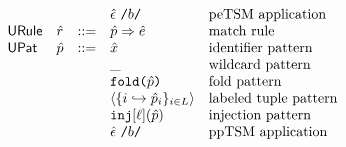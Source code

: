 \[\begin{array}{lllllll}
&&
& \utsmap{\uepsilon}{b} & \text{peTSM application}\\%
\mathsf{URule} & \urv & ::= 
& \matchrule{\upv}{\ue} & \text{match rule}\\
\mathsf{UPat} & \upv & ::= 
& \ux & \text{identifier pattern}\\
&&
& \wildp & \text{wildcard pattern}\\
&&
& \foldp{\upv} & \text{fold pattern}\\
&&
& \tplp{\mapschema{\upv}{i}{\labelset}} & \text{labeled tuple pattern}\\
&&
& \injp{\ell}{\upv} 
& \text{injection pattern}\\
&&
& \utsmap{\uepsilon}{b} & \text{ppTSM application}%
\end{array}\]

